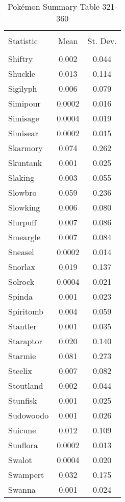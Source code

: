 \documentclass[12pt,twoside]{reedthesis}
\begin{document}
  \begin{table}[!htbp] \centering 
    \caption{Pokémon Summary Table 321-360} 
    \label{} 
  \begin{tabular}{@{\extracolsep{5pt}}lcc} 
  \\[-1.8ex]\hline 
  \hline \\[-1.8ex] 
  Statistic & \multicolumn{1}{c}{Mean} & \multicolumn{1}{c}{St. Dev.} \\ 
  \hline \\[-1.8ex] 
  Shiftry & 0.002 & 0.044 \\ 
  Shuckle & 0.013 & 0.114 \\ 
  Sigilyph & 0.006 & 0.079 \\ 
  Simipour & 0.0002 & 0.016 \\ 
  Simisage & 0.0004 & 0.019 \\ 
  Simisear & 0.0002 & 0.015 \\ 
  Skarmory & 0.074 & 0.262 \\ 
  Skuntank & 0.001 & 0.025 \\ 
  Slaking & 0.003 & 0.055 \\ 
  Slowbro & 0.059 & 0.236 \\ 
  Slowking & 0.006 & 0.080 \\ 
  Slurpuff & 0.007 & 0.086 \\ 
  Smeargle & 0.007 & 0.084 \\ 
  Sneasel & 0.0002 & 0.014 \\ 
  Snorlax & 0.019 & 0.137 \\ 
  Solrock & 0.0004 & 0.021 \\ 
  Spinda & 0.001 & 0.023 \\ 
  Spiritomb & 0.004 & 0.059 \\ 
  Stantler & 0.001 & 0.035 \\ 
  Staraptor & 0.020 & 0.140 \\ 
  Starmie & 0.081 & 0.273 \\ 
  Steelix & 0.007 & 0.082 \\ 
  Stoutland & 0.002 & 0.044 \\ 
  Stunfisk & 0.001 & 0.025 \\ 
  Sudowoodo & 0.001 & 0.026 \\ 
  Suicune & 0.012 & 0.109 \\ 
  Sunflora & 0.0002 & 0.013 \\ 
  Swalot & 0.0004 & 0.020 \\ 
  Swampert & 0.032 & 0.175 \\ 
  Swanna & 0.001 & 0.024 \\ 

\end{tabular}
\end{table}
\end{document}
